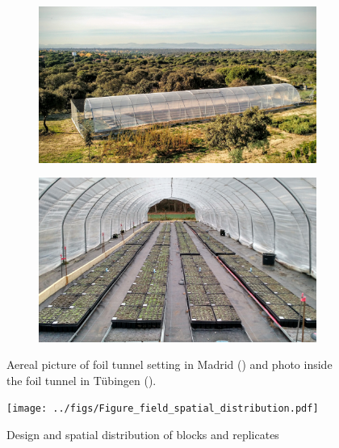 \documentclass[12pt,]{article}
\begin{document}
\begin{figure}
    \centering
    \begin{subfigure}[t]{0.45\textwidth}
        \centering
        \includegraphics[width=\linewidth]{../figs/IMG_20151113_154250988.jpg}
        \caption{} \label{fig:aereal}
    \end{subfigure}
    \begin{subfigure}[t]{0.45\textwidth}
        \centering
        \includegraphics[width=\linewidth]{../figs/IMG_20151121_162359474_HDR.jpg}
        \caption{} \label{fig:inside}
    \end{subfigure}
     \caption{Aereal picture of foil tunnel setting in Madrid () and photo inside the foil tunnel in Tübingen ().}
\end{figure}

\begin{figure}
 \centerline{\texttt{[image: ../figs/Figure\_field\_spatial\_distribution.pdf]}}
    \caption{ Design and spatial distribution of blocks and replicates}
    \label{fig:blocks}
\end{figure}
\end{document}
